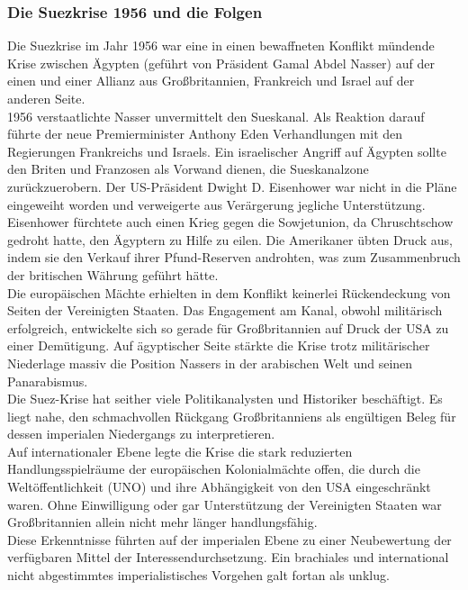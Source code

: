 \documentclass[letterpaper, 12pt]{article}
\let\tempsubsubsection\subsubsection
\renewcommand\subsubsection[1]{\vspace{0cm}\tempsubsubsection{#1}\vspace{0cm}}
\begin{document}
\subsubsection{Die Suezkrise 1956 und die Folgen}

Die Suezkrise im Jahr 1956 war eine in einen bewaffneten Konflikt mündende Krise zwischen Ägypten (geführt von Präsident Gamal Abdel Nasser) auf der einen und einer Allianz aus Großbritannien, Frankreich und Israel auf der anderen Seite. \\
1956 verstaatlichte Nasser unvermittelt den Sueskanal. Als Reaktion darauf führte der neue Premierminister Anthony Eden Verhandlungen mit den Regierungen Frankreichs und Israels. Ein israelischer Angriff auf Ägypten sollte den Briten und Franzosen als Vorwand dienen, die Sueskanalzone zurückzuerobern. Der US-Präsident Dwight D. Eisenhower war nicht in die Pläne eingeweiht worden und verweigerte aus Verärgerung jegliche Unterstützung. Eisenhower fürchtete auch einen Krieg gegen die Sowjetunion, da Chruschtschow gedroht hatte, den Ägyptern zu Hilfe zu eilen. Die Amerikaner übten Druck aus, indem sie den Verkauf ihrer Pfund-Reserven androhten, was zum Zusammenbruch der britischen Währung geführt hätte. \\
Die europäischen Mächte erhielten in dem Konflikt keinerlei Rückendeckung von Seiten der Vereinigten Staaten. Das Engagement am Kanal, obwohl militärisch erfolgreich, entwickelte sich so gerade für Großbritannien auf Druck der USA zu einer Demütigung. Auf ägyptischer Seite stärkte die Krise trotz militärischer Niederlage massiv die Position Nassers in der arabischen Welt und seinen Panarabismus. \\
Die Suez-Krise hat seither viele Politikanalysten und Historiker beschäftigt. Es liegt nahe, den schmachvollen Rückgang Großbritanniens als engültigen Beleg für dessen imperialen Niedergangs zu interpretieren. \\
Auf internationaler Ebene legte die Krise die stark reduzierten Handlungsspielräume der europäischen Kolonialmächte offen, die durch die Weltöffentlichkeit (UNO) und ihre Abhängigkeit von den USA eingeschränkt waren. Ohne Einwilligung oder gar Unterstützung der Vereinigten Staaten war Großbritannien allein nicht mehr länger handlungsfähig. \\
Diese Erkenntnisse führten auf der imperialen Ebene zu einer Neubewertung der verfügbaren Mittel der Interessendurchsetzung. Ein brachiales und international nicht abgestimmtes imperialistisches Vorgehen galt fortan als unklug.
\end{document}
